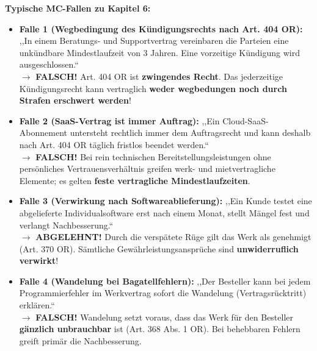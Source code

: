 \begin{important}
    \textbf{Typische MC-Fallen zu Kapitel 6:}
    \begin{itemize}
        \item \textbf{Falle 1 (Wegbedingung des Kündigungsrechts nach Art. 404 OR):} ,,In einem Beratungs- und Supportvertrag vereinbaren die Parteien eine unkündbare Mindestlaufzeit von 3 Jahren. Eine vorzeitige Kündigung wird ausgeschlossen.`` \\
        $\rightarrow$ \textbf{FALSCH!} Art. 404 OR ist \textbf{zwingendes Recht}. Das jederzeitige Kündigungsrecht kann vertraglich \textbf{weder wegbedungen noch durch Strafen erschwert werden}!
        \item \textbf{Falle 2 (SaaS-Vertrag ist immer Auftrag):} ,,Ein Cloud-SaaS-Abonnement untersteht rechtlich immer dem Auftragsrecht und kann deshalb nach Art. 404 OR täglich fristlos beendet werden.`` \\
        $\rightarrow$ \textbf{FALSCH!} Bei rein technischen Bereitstellungsleistungen ohne persönliches Vertrauensverhältnis greifen werk- und mietvertragliche Elemente; es gelten \textbf{feste vertragliche Mindestlaufzeiten}.
        \item \textbf{Falle 3 (Verwirkung nach Softwareablieferung):} ,,Ein Kunde testet eine abgelieferte Individualsoftware erst nach einem Monat, stellt Mängel fest und verlangt Nachbesserung.`` \\
        $\rightarrow$ \textbf{ABGELEHNT!} Durch die verspätete Rüge gilt das Werk als genehmigt (Art. 370 OR). Sämtliche Gewährleistungsansprüche sind \textbf{unwiderruflich verwirkt}!
        \item \textbf{Falle 4 (Wandelung bei Bagatellfehlern):} ,,Der Besteller kann bei jedem Programmierfehler im Werkvertrag sofort die Wandelung (Vertragsrücktritt) erklären.`` \\
        $\rightarrow$ \textbf{FALSCH!} Wandelung setzt voraus, dass das Werk für den Besteller \textbf{gänzlich unbrauchbar} ist (Art. 368 Abs. 1 OR). Bei behebbaren Fehlern greift primär die Nachbesserung.
    \end{itemize}
\end{important}
